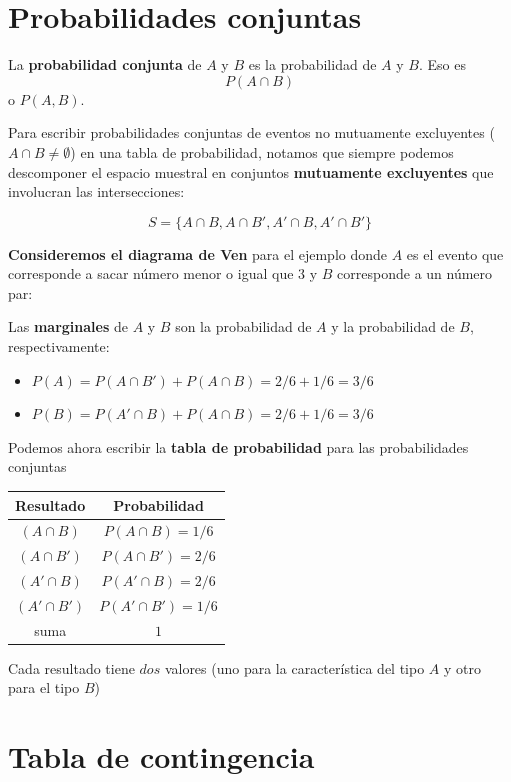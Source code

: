 \documentclass[
]{book}
\providecommand{\tightlist}{%
  \setlength{\itemsep}{0pt}\setlength{\parskip}{0pt}}
\begin{document}
\hypertarget{probabilidades-conjuntas}{%
\section{Probabilidades conjuntas}\label{probabilidades-conjuntas}}

La \textbf{probabilidad conjunta} de \(A\) y \(B\) es la probabilidad de \(A\) y \(B\). Eso es \[P(A \cap B)\] o \(P(A,B)\).

Para escribir probabilidades conjuntas de eventos no mutuamente excluyentes (\(A \cap B \neq \emptyset\)) en una tabla de probabilidad, notamos que siempre podemos descomponer el espacio muestral en conjuntos \textbf{mutuamente excluyentes} que involucran las intersecciones:

\[S=\{A\cap B, A \cap B', A'\cap B, A'\cap B'\}\]

\textbf{Consideremos el diagrama de Ven} para el ejemplo donde \(A\) es el evento que corresponde a sacar número menor o igual que \(3\) y \(B\) corresponde a un número par:

Las \textbf{marginales} de \(A\) y \(B\) son la probabilidad de \(A\) y la probabilidad de \(B\), respectivamente:

\begin{itemize}
\tightlist
\item
  \(P(A)=P(A\cap B') + P(A \cap B)=2/6+1/6=3/6\)
\item
  \(P(B)=P(A'\cap B) +P(A \cap B)=2/6+1/6=3/6\)
\end{itemize}

Podemos ahora escribir la \textbf{tabla de probabilidad} para las probabilidades conjuntas

\begin{longtable}[]{@{}cc@{}}
\toprule\noalign{}
Resultado & Probabilidad \\
\midrule\noalign{}
\endhead
\bottomrule\noalign{}
\endlastfoot
\((A \cap B)\) & \(P(A \cap B)=1/6\) \\
\((A\cap B')\) & \(P(A \cap B')=2/6\) \\
\((A' \cap B)\) & \(P(A' \cap B)=2/6\) \\
\((A' \cap B')\) & \(P(A' \cap B')=1/6\) \\
suma & \(1\) \\
\end{longtable}

Cada resultado tiene \(dos\) valores (uno para la característica del tipo \(A\) y otro para el tipo \(B\))

\hypertarget{tabla-de-contingencia}{%
\section{Tabla de contingencia}\label{tabla-de-contingencia}}
\end{document}
